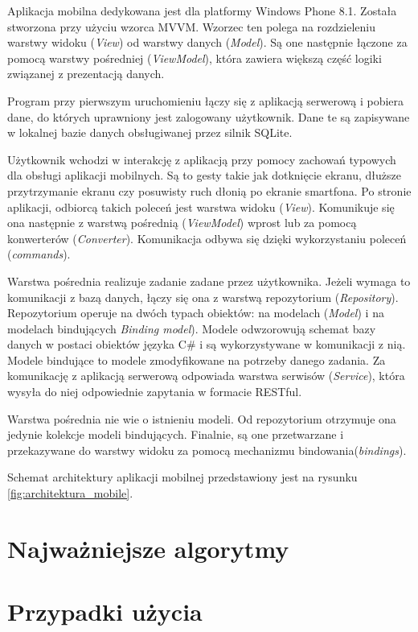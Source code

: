\documentclass{book}
\begin{document}
			Aplikacja mobilna dedykowana jest dla platformy Windows Phone 8.1. Została stworzona przy użyciu wzorca MVVM. Wzorzec ten polega na rozdzieleniu warstwy widoku (\emph{View}) od warstwy danych (\emph{Model}). Są one następnie łączone za pomocą warstwy pośredniej (\emph{ViewModel}), która zawiera większą część logiki związanej z prezentacją danych.
			
			Program przy pierwszym uruchomieniu łączy się z aplikacją serwerową i pobiera dane, do których uprawniony jest zalogowany użytkownik. Dane te są zapisywane w lokalnej bazie danych obsługiwanej przez silnik SQLite. 
			
			Użytkownik wchodzi w interakcję z aplikacją przy pomocy zachowań typowych dla obsługi aplikacji mobilnych. Są to gesty takie jak dotknięcie ekranu, dłuższe przytrzymanie ekranu czy posuwisty ruch dłonią po ekranie smartfona. 
			Po stronie aplikacji, odbiorcą takich poleceń jest warstwa widoku (\emph{View}). Komunikuje się ona następnie z warstwą pośrednią (\emph{ViewModel}) wprost lub za pomocą konwerterów (\emph{Converter}). Komunikacja odbywa się dzięki wykorzystaniu poleceń (\emph{commands}). 
			
			Warstwa pośrednia realizuje zadanie zadane przez użytkownika. Jeżeli wymaga to komunikacji z bazą danych, łączy się ona z warstwą repozytorium (\emph{Repository}). Repozytorium operuje na dwóch typach obiektów: na modelach (\emph{Model}) i na modelach bindujących \emph{Binding model}). Modele odwzorowują schemat bazy danych w postaci obiektów języka C\# i są wykorzystywane w komunikacji z nią. Modele bindujące to modele zmodyfikowane na potrzeby danego zadania. Za komunikację z aplikacją serwerową odpowiada warstwa serwisów (\emph{Service}), która wysyła do niej odpowiednie zapytania w formacie RESTful. 
			
			Warstwa pośrednia nie wie o istnieniu modeli. Od repozytorium otrzymuje ona jedynie kolekcje modeli bindujących. Finalnie, są one przetwarzane i przekazywane do warstwy widoku za pomocą mechanizmu bindowania(\emph{bindings}).
			
			Schemat architektury aplikacji mobilnej przedstawiony jest na rysunku \ref{fig:architektura_mobile}. 
			
		
		\section{Najważniejsze algorytmy}
		\section{Przypadki użycia}
		
\end{document}
